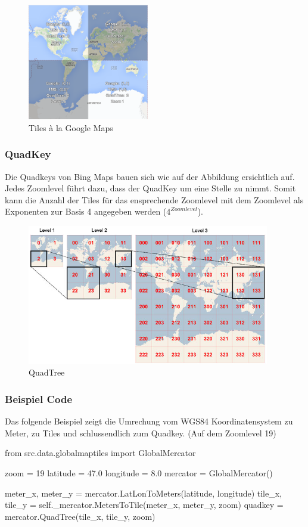 \begin{figure}[H]
	\centering
	\includegraphics[width=150pt]{images/tiles_a_la_google.png}
	\caption[Tiles à la Google Maps]{Tiles à la Google Maps}
\end{figure}

\subsubsection{QuadKey}
Die \Gls{Quadkeys} von Bing Maps bauen sich wie auf der Abbildung ersichtlich auf. Jedes Zoomlevel führt dazu, dass der QuadKey um eine Stelle zu nimmt. Somit kann die Anzahl der Tiles für das ensprechende Zoomlevel mit dem Zoomlevel als Exponenten zur Basis 4 angegeben werden ($4^{Zoomlevel}$).  \\
\begin{figure}[H]
	\centering
	\includegraphics[width=300pt]{images/quadkey.png}
	\caption[QuadTree]{\Gls{QuadTree}}
\end{figure}
\newpage
\subsubsection{Beispiel Code}
Das folgende Beispiel zeigt die Umrechung vom WGS84 Koordinatensystem zu Meter, zu Tiles und schlussendlich zum Quadkey. (Auf dem Zoomlevel 19) \\
\begin{python}
	from src.data.globalmaptiles import GlobalMercator
	
	zoom = 19
	latitude = 47.0
	longitude = 8.0
	mercator = GlobalMercator()
	
	meter_x, meter_y = mercator.LatLonToMeters(latitude, longitude)
	tile_x, tile_y = self._mercator.MetersToTile(meter_x, meter_y, zoom)
	quadkey = mercator.QuadTree(tile_x, tile_y, zoom)
\end{python}



